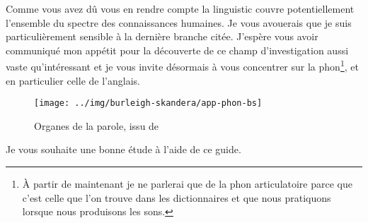 Comme vous avez dû vous en rendre compte la \gls{linguistic} couvre
potentiellement l'ensemble du spectre des connaissances humaines. Je
vous avouerais que je suis particulièrement sensible à la dernière
branche citée. J'espère vous avoir communiqué mon appétit pour la
découverte de ce champ d'investigation aussi vaste qu'intéressant et
je vous invite désormais à vous concentrer sur la
\gls{phon}\footnote{À partir de maintenant je ne parlerai que de la
  \gls{phon} articulatoire parce que c'est celle que l'on trouve dans
  les dictionnaires et que nous pratiquons lorsque nous produisons les
  sons.}, et en particulier celle de l'anglais.

\begin{center}
  \begin{figure}[h]
    \centering
    \texttt{[image: ../img/burleigh-skandera/app-phon-bs]}
    \caption{Organes de la parole, issu de~\cite{burleigh}}
    \label{fig:app-phon}
  \end{figure}
\end{center}

Je vous souhaite une bonne étude à l'aide de ce guide.

\newpage
\minitoc
